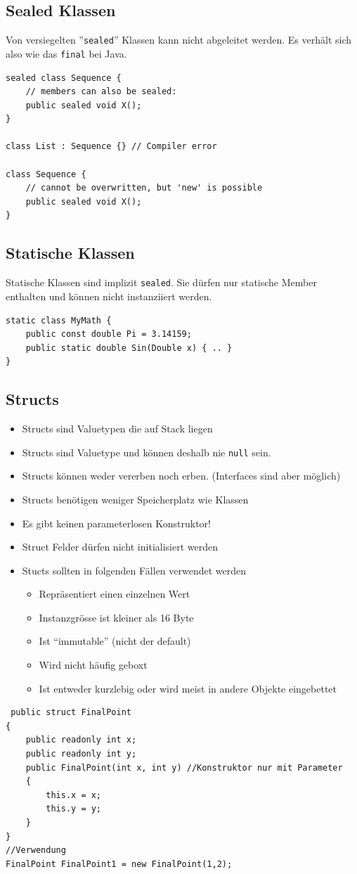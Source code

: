 \documentclass[
a4paper,
oneside,
10pt,
fleqn,
headsepline,
toc=listofnumbered, 
bibliography=totocnumbered]{scrartcl}
\begin{document}
\subsection{Sealed Klassen}
Von versiegelten ''\lstinline|sealed|'' Klassen kann nicht abgeleitet werden. Es verhält sich also wie das \lstinline|final| bei Java.
\begin{lstlisting}
sealed class Sequence {
	// members can also be sealed:
	public sealed void X();
}

class List : Sequence {} // Compiler error

class Sequence {
	// cannot be overwritten, but 'new' is possible
	public sealed void X();
}

\end{lstlisting}

\subsection{Statische Klassen}
Statische Klassen sind implizit \lstinline|sealed|. Sie dürfen nur statische Member enthalten und können nicht instanziiert werden.
\begin{lstlisting}
static class MyMath {
	public const double Pi = 3.14159;
	public static double Sin(Double x) { .. }
}
\end{lstlisting}
\clearpage

\subsection{Structs}
\begin{itemize}
	\item Structs sind Valuetypen die auf Stack liegen
	\item Structs sind Valuetype und können deshalb nie \lstinline[]|null| sein.
	\item Structs können weder vererben noch erben. (Interfaces sind aber möglich)
	\item Structs benötigen weniger Speicherplatz wie Klassen
	\item Es gibt keinen parameterlosen Konstruktor!
	\item Struct Felder dürfen nicht initialisiert werden
	\item Stucts sollten in folgenden Fällen verwendet werden
	\begin{itemize}
		\item Repräsentiert einen einzelnen Wert
		\item Instanzgrösse ist kleiner als 16 Byte
		\item Ist “immutable” (nicht der default)
		\item Wird nicht häufig geboxt
		\item Ist entweder kurzlebig oder wird meist in andere Objekte eingebettet
	\end{itemize}
\end{itemize}
\begin{lstlisting}
 public struct FinalPoint
{
    public readonly int x;
    public readonly int y; 
    public FinalPoint(int x, int y) //Konstruktor nur mit Parameter
    {
        this.x = x;
        this.y = y;
    }
}
//Verwendung
FinalPoint FinalPoint1 = new FinalPoint(1,2);
\end{lstlisting}
\end{document}

